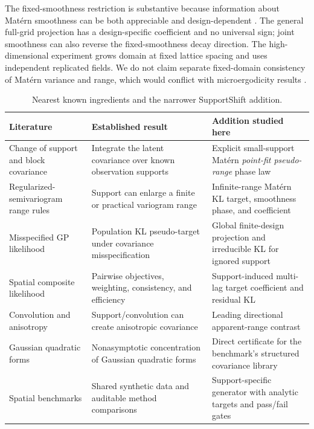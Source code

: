 \documentclass[sigconf]{acmart}
\theoremstyle{remark}
\begin{document}
The fixed-smoothness restriction is substantive because information about
Mat\'ern smoothness can be both appreciable and design-dependent
\cite{deoliveira2022information}. The general full-grid projection has a
design-specific coefficient and no universal sign; joint smoothness can also
reverse the fixed-smoothness decay direction. The
high-dimensional experiment grows domain at fixed
lattice spacing and uses independent replicated fields. We do not claim
separate fixed-domain consistency of Matérn variance and range, which would
conflict with microergodicity results
\cite{zhang2004inconsistent,kaufman2013range}.

\begin{table}[t]
\centering
\caption{Nearest known ingredients and the narrower SupportShift addition.}
\label{tab:literature}
\begin{tabular}{p{}p{}p{}}
\toprule
Literature & Established result & Addition studied here \\
\midrule
Change of support and block covariance
\cite{chiles2012geostatistics,gelfand2001support,fuentes2007approximate,
tanaka2019aggregated}
& Integrate the latent covariance over known observation supports
& Explicit small-support Matérn \emph{point-fit pseudo-range} phase law \\
Regularized-semivariogram range rules
\cite{clark1977regularization,bellehumeur1997aggregation}
& Support can enlarge a finite or practical variogram range
& Infinite-range Matérn KL target, smoothness phase, and coefficient \\
Misspecified GP likelihood \cite{bachoc2018misspecified}
& Population KL pseudo-target under covariance misspecification
& Global finite-design projection and irreducible KL for ignored support \\
Spatial composite likelihood
\cite{varin2011composite,bevilacqua2012weighted}
& Pairwise objectives, weighting, consistency, and efficiency
& Support-induced multi-lag target coefficient and residual KL \\
Convolution and anisotropy \cite{clifford2006yield,paciorek2006nonstationary}
& Support/convolution can create anisotropic covariance
& Leading directional apparent-range contrast \\
Gaussian quadratic forms \cite{laurent2000quadratic,hsu2012quadratic}
& Nonasymptotic concentration of Gaussian quadratic forms
& Direct certificate for the benchmark's structured covariance library \\
Spatial benchmarks \cite{heaton2019competition}
& Shared synthetic data and auditable method comparisons
& Support-specific generator with analytic targets and pass/fail gates \\
\bottomrule
\end{tabular}
\end{table}
\end{document}
